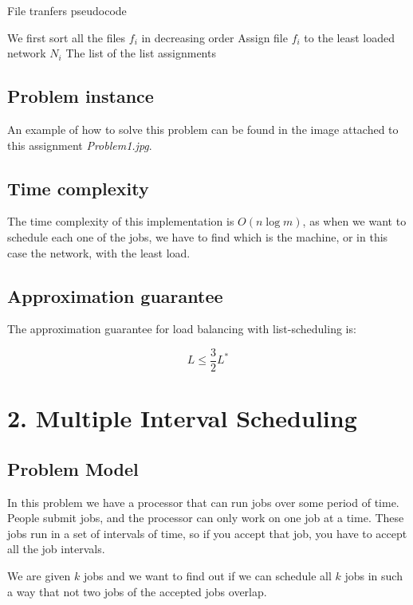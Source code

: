 \documentclass{article}
\begin{document}
\begin{algorithm}[H]
\caption{File tranfers pseudocode}
\begin{algorithmic}[1]
\State We first sort all the files $f_i$ in decreasing order
 \State Assign file $f_i$ to the least loaded network $N_i$
\EndWhile
\State \Return The list of the list assignments
\end{algorithmic}
\end{algorithm}

\subsection*{Problem instance}

An example of how to solve this problem can be found in the image attached to this assignment \textit{Problem1.jpg}.

\subsection*{Time complexity}

The time complexity of this implementation is $O(n\log m)$, as when we want to schedule each one of the jobs, we have to find which is the machine, or in this case the network, with the least load.

\subsection*{Approximation guarantee}

The approximation guarantee for load balancing with list-scheduling is:

$$L\leq \frac{3}{2} L^{\ast}$$

\section*{2. Multiple Interval Scheduling}

\subsection*{Problem Model}

In this problem we have a processor that can run jobs over some period of time. People submit jobs, and the processor can only work on one job at a time. These jobs run in a set of intervals of time, so if you accept that job, you have to accept all the job intervals.

We are given $k$ jobs and we want to find out if we can schedule all $k$ jobs in such a way that not two jobs of the accepted jobs overlap.
\end{document}

